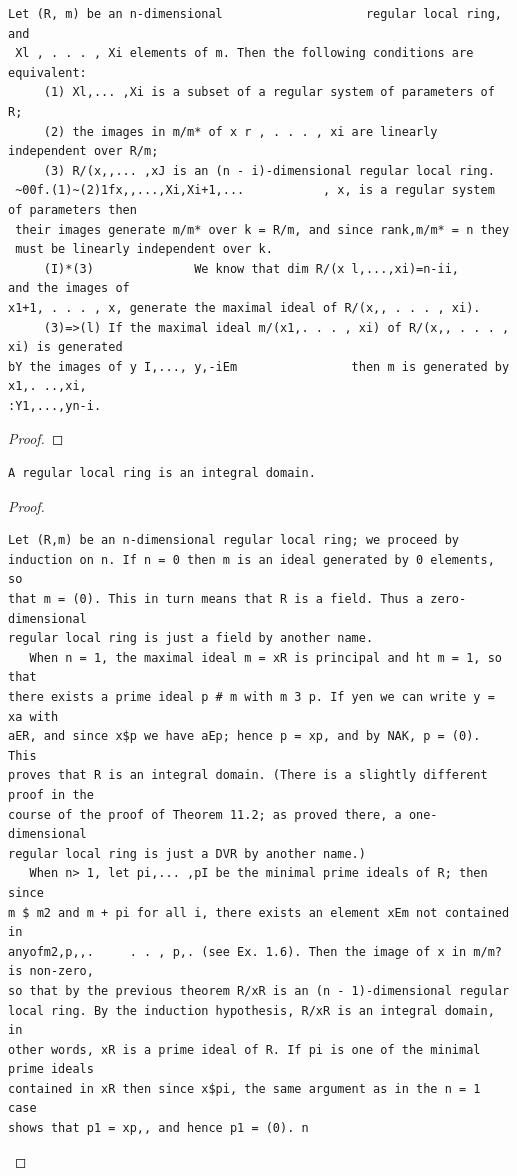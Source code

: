 \begin{theorem}\label{mcrt-auto-theorem-14-2}\uses{}
\begin{verbatim}
Let (R, m) be an n-dimensional                    regular local ring, and
 Xl , . . . , Xi elements of m. Then the following conditions are equivalent:
     (1) Xl,... ,Xi is a subset of a regular system of parameters of R;
     (2) the images in m/m* of x r , . . . , xi are linearly independent over R/m;
     (3) R/(x,,... ,xJ is an (n - i)-dimensional regular local ring.
 ~00f.(1)~(2)1fx,,...,Xi,Xi+1,...           , x, is a regular system of parameters then
 their images generate m/m* over k = R/m, and since rank,m/m* = n they
 must be linearly independent over k.
     (I)*(3)              We know that dim R/(x l,...,xi)=n-ii,      and the images of
x1+1, . . . , x, generate the maximal ideal of R/(x,, . . . , xi).
     (3)=>(l) If the maximal ideal m/(x1,. . . , xi) of R/(x,, . . . , xi) is generated
bY the images of y I,..., y,-iEm                then m is generated by x1,. ..,xi,
:Y1,...,yn-i.
\end{verbatim}
\end{theorem}
\begin{proof}
\notready
\end{proof}


\begin{theorem}\label{mcrt-auto-theorem-14-3}\uses{}
\begin{verbatim}
A regular local ring is an integral domain.
\end{verbatim}
\end{theorem}
\begin{proof}
\begin{verbatim}
Let (R,m) be an n-dimensional regular local ring; we proceed by
induction on n. If n = 0 then m is an ideal generated by 0 elements, so
that m = (0). This in turn means that R is a field. Thus a zero-dimensional
regular local ring is just a field by another name.
   When n = 1, the maximal ideal m = xR is principal and ht m = 1, so that
there exists a prime ideal p # m with m 3 p. If yen we can write y = xa with
aER, and since x$p we have aEp; hence p = xp, and by NAK, p = (0). This
proves that R is an integral domain. (There is a slightly different proof in the
course of the proof of Theorem 11.2; as proved there, a one-dimensional
regular local ring is just a DVR by another name.)
   When n> 1, let pi,... ,pI be the minimal prime ideals of R; then since
m $ m2 and m + pi for all i, there exists an element xEm not contained in
anyofm2,p,,.     . . , p,. (see Ex. 1.6). Then the image of x in m/m? is non-zero,
so that by the previous theorem R/xR is an (n - 1)-dimensional regular
local ring. By the induction hypothesis, R/xR is an integral domain, in
other words, xR is a prime ideal of R. If pi is one of the minimal prime ideals
contained in xR then since x$pi, the same argument as in the n = 1 case
shows that p1 = xp,, and hence p1 = (0). n
\end{verbatim}
\end{proof}


